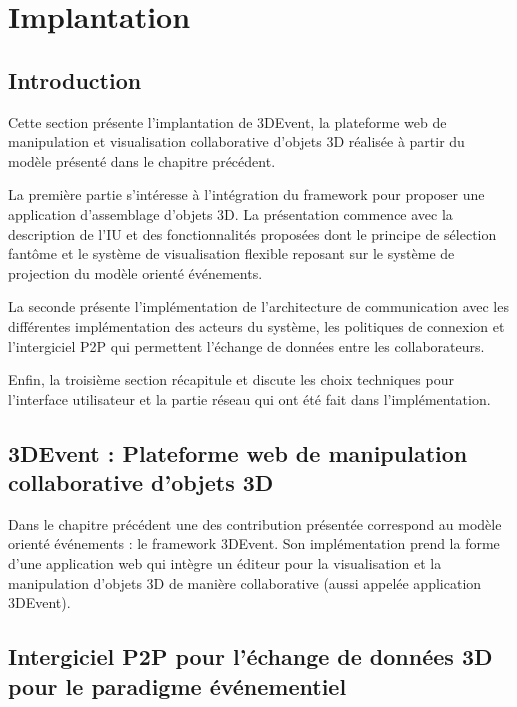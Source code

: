 
\chapter{Implantation}
\chaptertable

\section{Introduction} 
Cette section présente l'implantation de 3DEvent, la plateforme web de 
manipulation et visualisation collaborative d'objets \gls{3D} réalisée à partir du 
modèle 
présenté dans le chapitre précédent.

La première partie s'intéresse à l'intégration 
du framework pour proposer une application d'assemblage d'objets \gls{3D}. La 
présentation commence avec la description de l'\gls{IU} et des fonctionnalités 
proposées dont le principe de sélection fantôme et le système de visualisation 
flexible reposant sur le système de projection du modèle orienté événements. 

La seconde présente l'implémentation de l'architecture de communication avec les 
différentes implémentation des acteurs du système, les politiques de connexion et 
l'intergiciel \gls{P2P} qui permettent l'échange de données entre les collaborateurs.

Enfin, la troisième section récapitule et discute les choix techniques pour 
l'interface utilisateur et la partie réseau qui ont été fait dans l'implémentation.


\section{3DEvent : Plateforme web de manipulation collaborative d'objets 3D}
Dans le chapitre précédent une des contribution présentée correspond au 
modèle orienté événements : le \gls{framework} 3DEvent. 
Son implémentation prend la forme d'une application web qui intègre un éditeur 
pour la visualisation et la manipulation d'objets \gls{3D} de manière collaborative 
(aussi 
appelée \og application 3DEvent\fg{}).



\section{Intergiciel P2P pour l'échange de données 3D pour le paradigme 
événementiel}

